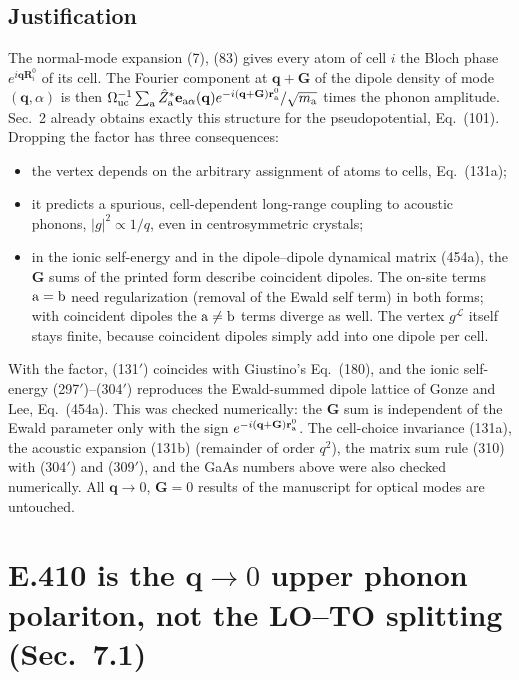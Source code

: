 \documentclass[11pt]{article}
\begin{document}
\subsection{Justification}
The normal-mode expansion (7), (83) gives every atom of cell $i$ the Bloch phase $e^{i\mathbf q\mathbf R^0_i}$
of its cell. The Fourier component at $\mathbf q+\mathbf G$ of the dipole density of mode $(\mathbf q,\alpha)$
is then $\Omega_{\rm uc}^{-1}\sum_{\rm a}\hat Z^*_{\rm a}\mathbf e_{{\rm a}\alpha}(\mathbf q)
e^{-i(\mathbf q+\mathbf G)\mathbf r^0_{\rm a}}/\sqrt{m_{\rm a}}$ times the phonon amplitude. Sec.~2 already
obtains exactly this structure for the pseudopotential, Eq.~(101). Dropping the factor has three
consequences:
\begin{itemize}
\item the vertex depends on the arbitrary assignment of atoms to cells, Eq.~(131a);
\item it predicts a spurious, cell-dependent long-range coupling to acoustic phonons, $|g|^2\propto1/q$,
even in centrosymmetric crystals;
\item in the ionic self-energy and in the dipole--dipole dynamical matrix (454a), the $\mathbf G$ sums of
the printed form describe coincident dipoles. The on-site terms ${\rm a}={\rm b}$ need regularization
(removal of the Ewald self term) in both forms; with coincident dipoles the ${\rm a}\neq{\rm b}$ terms
diverge as well. The vertex $g^{\mathcal L}$ itself stays finite, because coincident dipoles simply add
into one dipole per cell.
\end{itemize}
With the factor, (131$'$) coincides with Giustino's Eq.~(180), and the ionic self-energy
(297$'$)--(304$'$) reproduces the Ewald-summed dipole lattice of Gonze and Lee, Eq.~(454a). This was
checked numerically: the $\mathbf G$ sum is independent of the Ewald parameter only with the sign
$e^{-i(\mathbf q+\mathbf G)\mathbf r^0_{\rm a}}$. The cell-choice invariance (131a), the acoustic expansion
(131b) (remainder of order $q^2$), the matrix sum rule (310) with (304$'$) and (309$'$), and the GaAs
numbers above were also checked numerically. All $\mathbf q\to0$, $\mathbf G=0$ results of the manuscript for
optical modes are untouched.

\section{E.410 is the $\mathbf q\to0$ upper phonon polariton, not the LO--TO splitting (Sec.~7.1)}\label{sec:e410}
\end{document}
